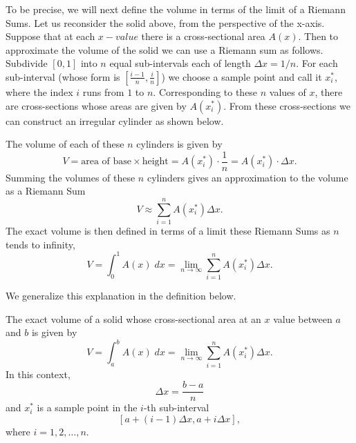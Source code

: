 \documentclass{ximera}
\begin{document}
\begin{explanation}
To be precise, we will next define the volume in terms of the limit of a Riemann Sums.  
Let us reconsider the solid above, from the perspective of the x-axis. Suppose that at
each $x-value$ there is a cross-sectional area $A(x)$. Then to approximate the volume of the solid we 
can use a Riemann sum as follows. Subdivide $[0,1]$ into $n$ equal sub-intervals each of length $\Delta x = 1/n$.
For each sub-interval (whose form is $[\frac{i-1}{n}, \frac{i}{n}]$) we choose a sample point and call it $x_i^*$, where 
the index $i$ runs from $1$ to $n$. 
Corresponding to these $n$ values of $x$, there are cross-sections whose areas are given by $A(x_i^*)$.
From these cross-sections we can construct an irregular cylinder as shown below.


The volume of each of these $n$ cylinders is given by
\[
V = \text{area of base} \times \text{height} = A(x_i^*) \cdot \frac{1}{n} = A(x_i^*) \cdot \Delta x.
\]
Summing the volumes of these $n$ cylinders gives an approximation to the volume as a Riemann Sum
\[
V \approx \sum_{i=1}^n A(x_i^*) \Delta x.
\]
The exact volume is then defined in terms of a limit these Riemann Sums as $n$ tends to infinity,
\[
V = \int_0^1 A(x) \; dx = \lim_{n \to \infty} \sum_{i=1}^n A(x_i^*) \Delta x.
\]

\end{explanation}

We generalize this explanation in the definition below.

\begin{definition}
The exact volume of a solid whose cross-sectional area at an $x$ value between $a$ and $b$ is given by
\[
V = \int_a^b A(x) \; dx = \lim_{n \to \infty} \sum_{i=1}^n A(x_i^*) \Delta x.
\]
In this context, 
\[
\Delta x = \frac{b-a}{n}
\] 
and $x_i^*$ is a sample point in the $i$-th sub-interval
\[
[a + (i-1)\Delta x, a + i\Delta x],
\]
where $i = 1, 2, \dots, n$.
\end{definition}















































\begin{center}
\begin{foldable}
\end{foldable}
\end{center}
\end{document}
